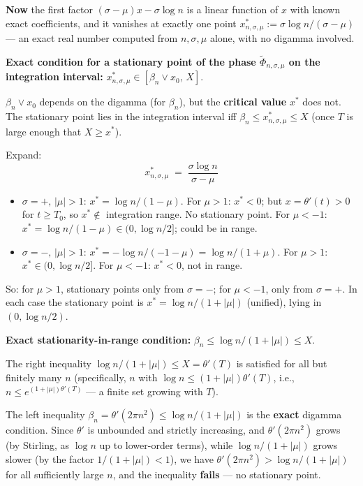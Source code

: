 \textbf{Now} the first factor $(\sigma-\mu)x-\sigma\log n$ is a linear function of $x$ with known exact coefficients, and it vanishes at exactly one point $x^{*}_{n,\sigma,\mu} := \sigma\log n/(\sigma-\mu)$ --- an exact real number computed from $n,\sigma,\mu$ alone, with no digamma involved.

\textbf{Exact condition for a stationary point of the phase $\widetilde\Phi_{n,\sigma,\mu}$ on the integration interval:} $x^{*}_{n,\sigma,\mu}\in[\beta_{n}\vee x_{0},\,X]$.

$\beta_{n}\vee x_{0}$ depends on the digamma (for $\beta_{n}$), but the \textbf{critical value} $x^{*}$ does not. The stationary point lies in the integration interval iff $\beta_{n}\le x^{*}_{n,\sigma,\mu}\le X$ (once $T$ is large enough that $X\ge x^{*}$).

Expand:
\[
x^{*}_{n,\sigma,\mu} \;=\; \frac{\sigma\log n}{\sigma-\mu}
\]
\begin{itemize}
\item $\sigma=+,\,|\mu|>1$: $x^{*} = \log n/(1-\mu)$. For $\mu>1$: $x^{*}<0$; but $x=\theta'(t)>0$ for $t\ge T_{0}$, so $x^{*}\notin$ integration range. No stationary point. For $\mu<-1$: $x^{*}=\log n/(1-\mu)\in(0,\log n/2]$; could be in range.
\item $\sigma=-,\,|\mu|>1$: $x^{*} = -\log n/(-1-\mu)=\log n/(1+\mu)$. For $\mu>1$: $x^{*}\in(0,\log n/2]$. For $\mu<-1$: $x^{*}<0$, not in range.
\end{itemize}

So: for $\mu>1$, stationary points only from $\sigma=-$; for $\mu<-1$, only from $\sigma=+$. In each case the stationary point is $x^{*}=\log n/(1+|\mu|)$ (unified), lying in $(0,\log n/2)$.

\textbf{Exact stationarity-in-range condition:} $\beta_{n}\le \log n/(1+|\mu|)\le X$.

The right inequality $\log n/(1+|\mu|)\le X = \theta'(T)$ is satisfied for all but finitely many $n$ (specifically, $n$ with $\log n\le(1+|\mu|)\theta'(T)$, i.e., $n\le e^{(1+|\mu|)\theta'(T)}$ --- a finite set growing with $T$).

The left inequality $\beta_{n}=\theta'(2\pi n^{2})\le\log n/(1+|\mu|)$ is the \textbf{exact} digamma condition. Since $\theta'$ is unbounded and strictly increasing, and $\theta'(2\pi n^{2})$ grows (by Stirling, as $\log n$ up to lower-order terms), while $\log n/(1+|\mu|)$ grows slower (by the factor $1/(1+|\mu|)<1$), we have $\theta'(2\pi n^{2}) > \log n/(1+|\mu|)$ for all sufficiently large $n$, and the inequality \textbf{fails} --- no stationary point.

